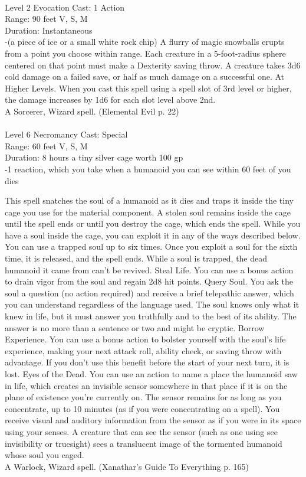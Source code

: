 \documentclass[10pt,twocolumn]{report}
\begin{document}
 \\
Level 2 \quad Evocation \quad Cast: 1 Action\\
Range: 90 feet \quad V, S, M\\
Duration: Instantaneous \quad \\
-(a piece of ice or a small white rock chip)
A flurry of magic snowballs erupts from a point you choose within range. Each creature in a 5-foot-radius sphere centered on that point must make a Dexterity saving throw. A creature takes 3d6 cold damage on a failed save, or half as much damage on a successful one.
At Higher Levels. When you cast this spell using a spell slot of 3rd level or higher, the damage increases by 1d6 for each slot level above 2nd.\\
A Sorcerer, Wizard spell. (Elemental Evil p. 22) \\


 \\
Level 6 \quad Necromancy \quad Cast: Special\\
Range: 60 feet \quad V, S, M\\
Duration: 8 hours \quad a tiny silver cage worth 100 gp\\
-1 reaction, which you take when a humanoid you can see within 60 feet of you dies

This spell snatches the soul of a humanoid as it dies and traps it inside the tiny cage you use for the material component. A stolen soul remains inside the cage until the spell ends or until you destroy the cage, which ends the spell. While you have a soul inside the cage, you can exploit it in any of the ways described below. You can use a trapped soul up to six times. Once you exploit a soul for the sixth time, it is released, and the spell ends. While a soul is trapped, the dead humanoid it came from can’t be revived.
Steal Life. You can use a bonus action to drain vigor from the soul and regain 2d8 hit points.
Query Soul. You ask the soul a question (no action required) and receive a brief telepathic answer, which you can understand regardless of the language used. The soul knows only what it knew in life, but it must answer you truthfully and to the best of its ability. The answer is no more than a sentence or two and might be cryptic.
Borrow Experience. You can use a bonus action to bolster yourself with the soul’s life experience, making your next attack roll, ability check, or saving throw with advantage. If you don’t use this benefit before the start of your next turn, it is lost.
Eyes of the Dead. You can use an action to name a place the humanoid saw in life, which creates an invisible sensor somewhere in that place if it is on the plane of existence you’re currently on. The sensor remains for as long as you concentrate, up to 10 minutes (as if you were concentrating on a spell). You receive visual and auditory information from the sensor as if you were in its space using your senses.
A creature that can see the sensor (such as one using see invisibility or truesight) sees a translucent image of the tormented humanoid whose soul you caged.\\
A Warlock, Wizard spell. (Xanathar's Guide To Everything p. 165) \\
\end{document}
